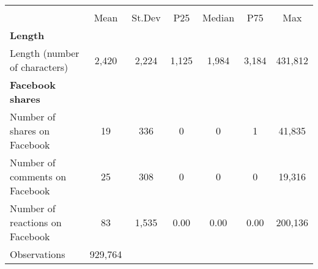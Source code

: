 {
\def\sym#1{\ifmmode^{#1}\else\(^{#1}\)\fi}
\begin{tabular}{l*{1}{cccccc}}
\hline\hline
                    &\multicolumn{6}{c}{}                                                         \\
                    &        Mean&      St.Dev&         P25&      Median&         P75&         Max\\
\hline
\textbf{Length}     &            &            &            &            &            &            \\
Length (number of characters)&       2,420&       2,224&       1,125&       1,984&       3,184&     431,812\\
\textbf{Facebook shares}&            &            &            &            &            &            \\
Number of shares on Facebook&          19&         336&           0&           0&           1&      41,835\\
Number of comments on Facebook&          25&         308&           0&           0&           0&      19,316\\
Number of reactions on Facebook&          83&       1,535&        0.00&        0.00&        0.00&     200,136\\
\hline
Observations        &     929,764&            &            &            &            &            \\
\hline\hline
\end{tabular}
}
